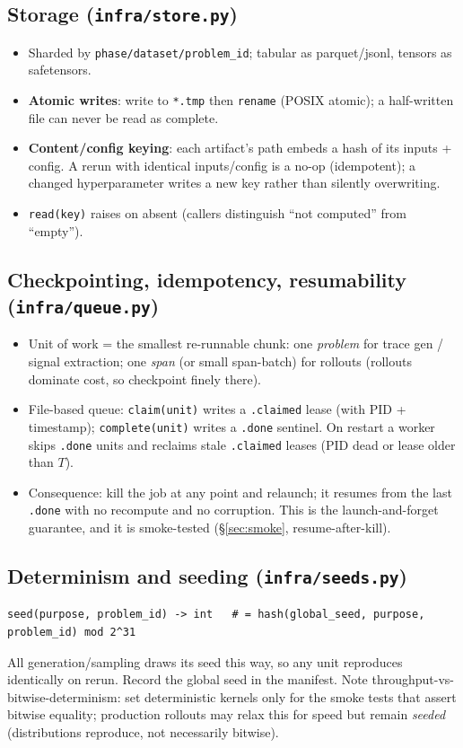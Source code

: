\documentclass[11pt]{article}
\begin{document}
\subsection{Storage (\texttt{infra/store.py})}
\begin{itemize}
\item Sharded by \texttt{phase/dataset/problem\_id}; tabular as parquet/jsonl, tensors as safetensors.
\item \textbf{Atomic writes}: write to \texttt{*.tmp} then \texttt{rename} (POSIX atomic); a half-written
file can never be read as complete.
\item \textbf{Content/config keying}: each artifact's path embeds a hash of its inputs + config. A rerun
with identical inputs/config is a no-op (idempotent); a changed hyperparameter writes a new key rather
than silently overwriting.
\item \texttt{read(key)} raises on absent (callers distinguish ``not computed'' from ``empty'').
\end{itemize}

\subsection{Checkpointing, idempotency, resumability (\texttt{infra/queue.py})}
\begin{itemize}
\item Unit of work = the smallest re-runnable chunk: one \emph{problem} for trace gen / signal
extraction; one \emph{span} (or small span-batch) for rollouts (rollouts dominate cost, so checkpoint
finely there).
\item File-based queue: \texttt{claim(unit)} writes a \texttt{.claimed} lease (with PID + timestamp);
\texttt{complete(unit)} writes a \texttt{.done} sentinel. On restart a worker skips \texttt{.done} units
and reclaims stale \texttt{.claimed} leases (PID dead or lease older than $T$).
\item Consequence: kill the job at any point and relaunch; it resumes from the last \texttt{.done} with
no recompute and no corruption. This is the launch-and-forget guarantee, and it is smoke-tested
(\S\ref{sec:smoke}, resume-after-kill).
\end{itemize}

\subsection{Determinism and seeding (\texttt{infra/seeds.py})}
\begin{lstlisting}
seed(purpose, problem_id) -> int   # = hash(global_seed, purpose, problem_id) mod 2^31
\end{lstlisting}
All generation/sampling draws its seed this way, so any unit reproduces identically on rerun. Record the
global seed in the manifest. Note throughput-vs-bitwise-determinism: set deterministic kernels only for
the smoke tests that assert bitwise equality; production rollouts may relax this for speed but remain
\emph{seeded} (distributions reproduce, not necessarily bitwise).
\end{document}
